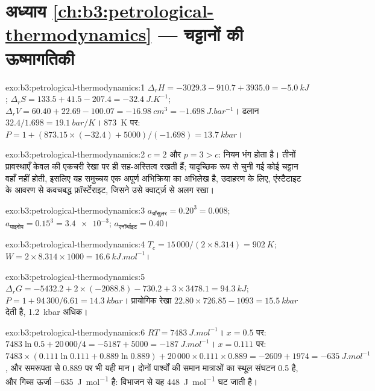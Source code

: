 \section*{अध्याय \ref{ch:b3:petrological-thermodynamics} --- चट्टानों की ऊष्मागतिकी}

\begin{solution}{exo:b3:petrological-thermodynamics:1}
$\Delta_rH = -3029.3 - 910.7 + 3935.0 = \qty{-5.0}{kJ}$; $\Delta_rS = 133.5 +
41.5 - 207.4 = \qty{-32.4}{J.K^{-1}}$; $\Delta_rV = 60.40 + 22.69 - 100.07 =
\qty{-16.98}{cm^3} = \qty{-1.698}{J.bar^{-1}}$। ढलान $32.4/1.698 =
\qty{19.1}{bar/K}$। \qty{873}{K} पर: $P = 1 + (873.15\times(-32.4) +
5000)/(-1.698) = \qty{13.7}{kbar}$।
\end{solution}

\begin{solution}{exo:b3:petrological-thermodynamics:2}
$c = 2$ और $p = 3 > c$: नियम भंग होता है। तीनों प्रावस्थाएँ केवल
 की एकचरी रेखा पर ही सह-अस्तित्व रखती हैं;
यादृच्छिक रूप से चुनी गई कोई चट्टान वहाँ नहीं होती, इसलिए यह समुच्चय एक अपूर्ण अभिक्रिया का अभिलेख है,
उदाहरण के लिए, एंस्टैटाइट के आवरण से कवचबद्ध फ़ॉर्स्टेराइट, जिसने उसे क्वार्ट्ज़ से
अलग रखा।
\end{solution}

\begin{solution}{exo:b3:petrological-thermodynamics:3}
$a_{\text{ग्रॉसुलर}} = 0.20^3 = 0.008$; $a_{\text{पाइरोप}} = 0.15^3 =
\num{3.4e-3}$; $a_{\text{एनॉर्थाइट}} = 0.40$।
\end{solution}

\begin{solution}{exo:b3:petrological-thermodynamics:4}
$T_c = 15\,000/(2\times8.314) = \qty{902}{K}$; $W = 2\times8.314\times1000
= \qty{16.6}{kJ.mol^{-1}}$।
\end{solution}

\begin{solution}{exo:b3:petrological-thermodynamics:5}
$\Delta_rG = -5432.2 + 2\times(-2088.8) - 730.2 + 3\times3478.1 =
\qty{94.3}{kJ}$; $P = 1 + 94\,300/6.61 = \qty{14.3}{kbar}$। प्रायोगिक
रेखा $22.80\times726.85 - 1093 = \qty{15.5}{kbar}$ देती है,
\qty{1.2}{kbar} अधिक।
\end{solution}

\begin{solution}{exo:b3:petrological-thermodynamics:6}
$RT = \qty{7483}{J.mol^{-1}}$। $x = 0.5$ पर: $7483\ln0.5 + 20\,000/4 = -5187 +
5000 = \qty{-187}{J.mol^{-1}}$। $x = 0.111$ पर: $7483\times(0.111\ln0.111 +
0.889\ln0.889) + 20\,000\times0.111\times0.889 = -2609 + 1974 =
\qty{-635}{J.mol^{-1}}$, और समरूपता से 0.889 पर भी यही मान। दोनों पार्श्वों की समान मात्राओं का
स्थूल संघटन 0.5 है, और गिब्स ऊर्जा
\qty{-635}{J.mol^{-1}} है: विभाजन से यह \qty{448}{J.mol^{-1}} घट जाती है।
\end{solution}

